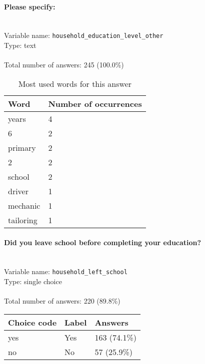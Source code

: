 \documentclass[11.5pt, a4paper]{scrartcl}
\begin{document}
\paragraph{Please specify:}
\  \\Variable name: \texttt{household\_education\_level\_other}\\
Type: text\\
\\Total number of answers: 245 (100.0\%)
\\[0.2em]\begin{table}[H]
 \begin{tabular}{p{4cm}|p{8cm}}
Word & Number of occurrences  \\
\hline
\cellcolor{mygray}years&\cellcolor{mygray}4\\
\hline
6&2\\
\hline
\cellcolor{mygray}primary&\cellcolor{mygray}2\\
\hline
2&2\\
\hline
\cellcolor{mygray}school&\cellcolor{mygray}2\\
\hline
driver&1\\
\hline
\cellcolor{mygray}mechanic&\cellcolor{mygray}1\\
\hline
tailoring&1\\
\hline
\end{tabular}
\caption{\label{tab:table-name} Most used words for this answer}
\end{table}
\paragraph{Did you leave school before completing your education?}
\  \\Variable name: \texttt{household\_left\_school}\\
Type: single choice\\
\\Total number of answers: 220 (89.8\%)
\\[0.2em] \begin{tabular}{p{4cm}|p{8cm}|p{3cm}}
Choice code & Label & Answers \\
\hline
yes & Yes& \cellcolor{color3}163 (74.1\%)\\
\cellcolor{mygray} no & \cellcolor{mygray}No & \cellcolor{color1}57 (25.9\%)\\
\end{tabular}
\end{document}
